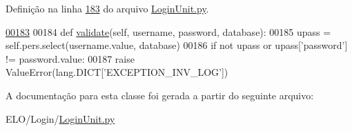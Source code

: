 Definição na linha \hyperlink{LoginUnit_8py_source_l00183}{183} do arquivo \hyperlink{LoginUnit_8py_source}{Login\-Unit.\-py}.


\begin{DoxyCode}
\hypertarget{classLogin_1_1LoginUnit_1_1BusLogin_l00183}{}\hyperlink{classLogin_1_1LoginUnit_1_1BusLogin_a2301425767b811697ce559801b955a58}{00183} 
00184     \textcolor{keyword}{def }\hyperlink{classLogin_1_1LoginUnit_1_1BusLogin_a2301425767b811697ce559801b955a58}{validate}(self, username, password, database):
00185         upass = self.pers.select(username.value, database)
00186         \textcolor{keywordflow}{if} \textcolor{keywordflow}{not} upass \textcolor{keywordflow}{or} upass[\textcolor{stringliteral}{'password'}] != password.value:
00187             \textcolor{keywordflow}{raise} ValueError(lang.DICT[\textcolor{stringliteral}{'EXCEPTION\_INV\_LOG'}])

\end{DoxyCode}


A documentação para esta classe foi gerada a partir do seguinte arquivo\-:\begin{DoxyCompactItemize}
\item 
E\-L\-O/\-Login/\hyperlink{LoginUnit_8py}{Login\-Unit.\-py}\end{DoxyCompactItemize}
